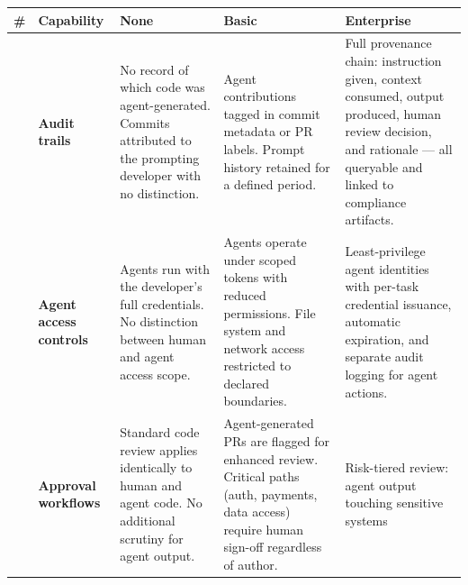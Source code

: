 \documentclass[
  a4paper,
  DIV=11,
  numbers=noendperiod]{scrreprt}
\newcounter{none} %
\begin{document}
{\def\LTcaptype{none} %
\begin{longtable}[]{@{}
  >{\raggedright\arraybackslash}p{}
  >{\raggedright\arraybackslash}p{}
  >{\raggedright\arraybackslash}p{}
  >{\raggedright\arraybackslash}p{}
  >{\raggedright\arraybackslash}p{}@{}}
\toprule\noalign{}
\begin{minipage}[b]{\linewidth}\raggedright
\#
\end{minipage} & \begin{minipage}[b]{\linewidth}\raggedright
Capability
\end{minipage} & \begin{minipage}[b]{\linewidth}\raggedright
None
\end{minipage} & \begin{minipage}[b]{\linewidth}\raggedright
Basic
\end{minipage} & \begin{minipage}[b]{\linewidth}\raggedright
Enterprise
\end{minipage} \\
\midrule\noalign{}
\endhead
\bottomrule\noalign{}
\endlastfoot
1 & \textbf{Audit trails} & No record of which code was agent-generated.
Commits attributed to the prompting developer with no distinction. &
Agent contributions tagged in commit metadata or PR labels. Prompt
history retained for a defined period. & Full provenance chain:
instruction given, context consumed, output produced, human review
decision, and rationale --- all queryable and linked to compliance
artifacts. \\
2 & \textbf{Agent access controls} & Agents run with the developer's
full credentials. No distinction between human and agent access scope. &
Agents operate under scoped tokens with reduced permissions. File system
and network access restricted to declared boundaries. & Least-privilege
agent identities with per-task credential issuance, automatic
expiration, and separate audit logging for agent actions. \\
3 & \textbf{Approval workflows} & Standard code review applies
identically to human and agent code. No additional scrutiny for agent
output. & Agent-generated PRs are flagged for enhanced review. Critical
paths (auth, payments, data access) require human sign-off regardless of
author. & Risk-tiered review: agent output touching sensitive systems

\end{longtable}}
\end{document}
